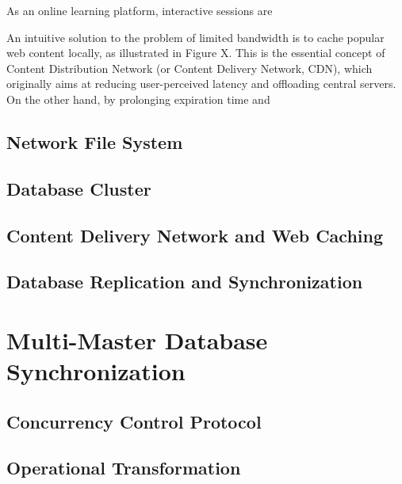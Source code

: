 As an online learning platform, interactive sessions are 

An intuitive solution to the problem of limited bandwidth is to cache popular web content locally, as illustrated in Figure X. This is the essential concept of Content Distribution Network (or Content Delivery Network, CDN), which originally aims at reducing user-perceived latency and offloading central servers\cite{dilley2002globally}. On the other hand, by prolonging expiration time and 


\subsection{Network File System}

\subsection{Database Cluster}

\subsection{Content Delivery Network and Web Caching}

\subsection{Database Replication and Synchronization}

\section{Multi-Master Database Synchronization}

\subsection{Concurrency Control Protocol}

\subsection{Operational Transformation}